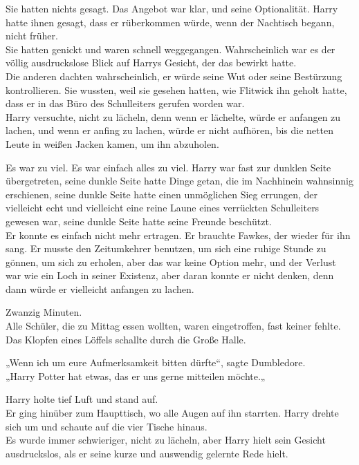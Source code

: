 {Sie hatten nichts gesagt. Das Angebot war klar, und seine Optionalität. Harry hatte ihnen gesagt, dass er rüberkommen würde, wenn der Nachtisch begann, nicht früher.\\ Sie hatten genickt und waren schnell weggegangen. Wahrscheinlich war es der völlig ausdruckslose Blick auf Harrys Gesicht, der das bewirkt hatte.\\ Die anderen dachten wahrscheinlich, er würde seine Wut oder seine Bestürzung kontrollieren. Sie wussten, weil sie gesehen hatten, wie Flitwick ihn geholt hatte, dass er in das Büro des Schulleiters gerufen worden war.\\ Harry versuchte, nicht zu lächeln, denn wenn er lächelte, würde er anfangen zu lachen, und wenn er anfing zu lachen, würde er nicht aufhören, bis die netten Leute in weißen Jacken kamen, um ihn abzuholen.

Es war zu viel. Es war einfach alles zu viel. Harry war fast zur dunklen Seite übergetreten, seine dunkle Seite hatte Dinge getan, die im Nachhinein wahnsinnig erschienen, seine dunkle Seite hatte einen unmöglichen Sieg errungen, der vielleicht echt und vielleicht eine reine Laune eines verrückten Schulleiters gewesen war, seine dunkle Seite hatte seine Freunde beschützt.\\ Er konnte es einfach nicht mehr ertragen. Er brauchte Fawkes, der wieder für ihn sang. Er musste den Zeitumkehrer benutzen, um sich eine ruhige Stunde zu gönnen, um sich zu erholen, aber das war keine Option mehr, und der Verlust war wie ein Loch in seiner Existenz, aber daran konnte er nicht denken, denn dann würde er vielleicht anfangen zu lachen.

Zwanzig Minuten.\\ Alle Schüler, die zu Mittag essen wollten, waren eingetroffen, fast keiner fehlte. Das Klopfen eines Löffels schallte durch die Große Halle.

„Wenn ich um eure Aufmerksamkeit bitten dürfte“, sagte Dumbledore.\\ „Harry Potter hat etwas, das er uns gerne mitteilen möchte.„

Harry holte tief Luft und stand auf.\\ Er ging hinüber zum Haupttisch, wo alle Augen auf ihn starrten. Harry drehte sich um und schaute auf die vier Tische hinaus.\\ Es wurde immer schwieriger, nicht zu lächeln, aber Harry hielt sein Gesicht ausdruckslos, als er seine kurze und auswendig gelernte Rede hielt.

}
